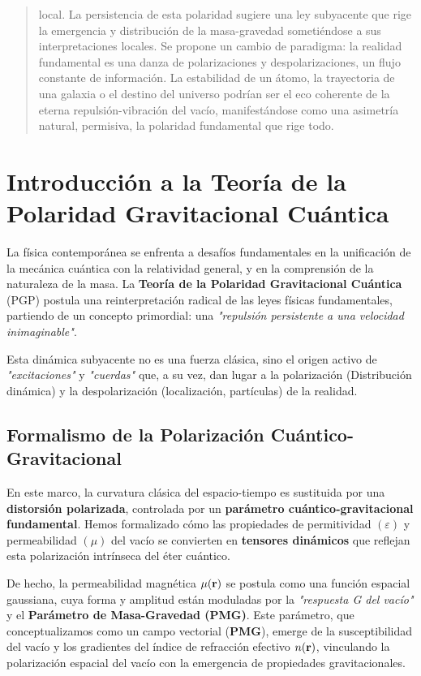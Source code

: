 \documentclass[11pt, a4paper]{article}
\begin{document}
\begin{abstract}
local. La persistencia de esta polaridad sugiere una ley subyacente que rige la emergencia y distribución de la masa-gravedad sometiéndose a sus interpretaciones locales. Se propone un cambio de paradigma: la realidad fundamental es una danza de polarizaciones y despolarizaciones, un flujo constante de información. La estabilidad de un átomo, la trayectoria de una galaxia o el destino del universo podrían ser el eco coherente de la eterna repulsión-vibración del vacío, manifestándose como una asimetría natural, permisiva, la polaridad fundamental que rige todo.
\end{abstract}

\section{Introducción a la Teoría de la Polaridad Gravitacional Cuántica}

La física contemporánea se enfrenta a desafíos fundamentales en la unificación de la mecánica cuántica con la relatividad general, y en la comprensión de la naturaleza de la masa. La \textbf{Teoría de la Polaridad Gravitacional Cuántica} (PGP) postula una reinterpretación radical de las leyes físicas fundamentales, partiendo de un concepto primordial: una \textit{"repulsión persistente a una velocidad inimaginable"}.

Esta dinámica subyacente no es una fuerza clásica, sino el origen activo de \textit{"excitaciones"} y \textit{"cuerdas"} que, a su vez, dan lugar a la polarización (Distribución dinámica) y la despolarización (localización, partículas) de la realidad.

\subsection{Formalismo de la Polarización Cuántico-Gravitacional}

En este marco, la curvatura clásica del espacio-tiempo es sustituida por una \textbf{distorsión polarizada}, controlada por un \textbf{parámetro cuántico-gravitacional fundamental}. Hemos formalizado cómo las propiedades de permitividad \((\varepsilon)\) y permeabilidad \((\mu)\) del vacío se convierten en \textbf{tensores dinámicos} que reflejan esta polarización intrínseca del éter cuántico.

De hecho, la permeabilidad magnética \(\mu(\vb{r})\) se postula como una función espacial gaussiana, cuya forma y amplitud están moduladas por la \textit{"respuesta G del vacío"} y el \textbf{Parámetro de Masa-Gravedad (PMG)}. Este parámetro, que conceptualizamos como un campo vectorial (\textbf{PMG}), emerge de la susceptibilidad del vacío y los gradientes del índice de refracción efectivo \(n(\vb{r})\), vinculando la polarización espacial del vacío con la emergencia de propiedades gravitacionales.
\end{document}

